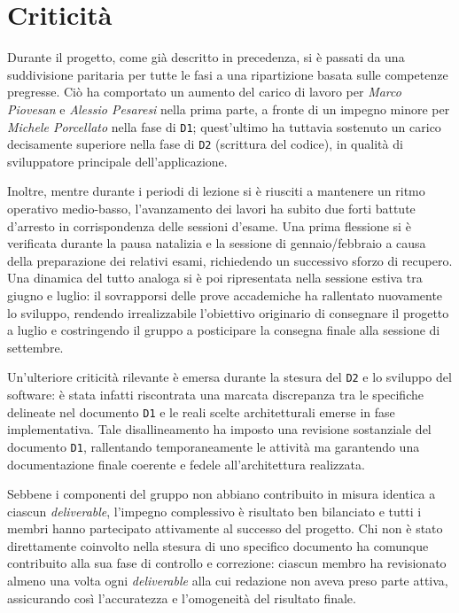 \section{Criticità}

Durante il progetto, come già descritto in precedenza, si è passati da una suddivisione paritaria per tutte le fasi a una ripartizione basata sulle competenze pregresse. Ciò ha comportato un aumento del carico di lavoro per \textit{Marco Piovesan} e \textit{Alessio Pesaresi} nella prima parte, a fronte di un impegno minore per \textit{Michele Porcellato} nella fase di \texttt{D1}; quest'ultimo ha tuttavia sostenuto un carico decisamente superiore nella fase di \texttt{D2} (scrittura del codice), in qualità di sviluppatore principale dell'applicazione.

Inoltre, mentre durante i periodi di lezione si è riusciti a mantenere un ritmo operativo medio-basso, l'avanzamento dei lavori ha subito due forti battute d'arresto in corrispondenza delle sessioni d'esame. Una prima flessione si è verificata durante la pausa natalizia e la sessione di gennaio/febbraio a causa della preparazione dei relativi esami, richiedendo un successivo sforzo di recupero. Una dinamica del tutto analoga si è poi ripresentata nella sessione estiva tra giugno e luglio: il sovrapporsi delle prove accademiche ha rallentato nuovamente lo sviluppo, rendendo irrealizzabile l'obiettivo originario di consegnare il progetto a luglio e costringendo il gruppo a posticipare la consegna finale alla sessione di settembre.

Un'ulteriore criticità rilevante è emersa durante la stesura del \texttt{D2} e lo sviluppo del software: è stata infatti riscontrata una marcata discrepanza tra le specifiche delineate nel documento \texttt{D1} e le reali scelte architetturali emerse in fase implementativa. Tale disallineamento ha imposto una revisione sostanziale del documento \texttt{D1}, rallentando temporaneamente le attività ma garantendo una documentazione finale coerente e fedele all'architettura realizzata.

Sebbene i componenti del gruppo non abbiano contribuito in misura identica a ciascun \textit{deliverable}, l'impegno complessivo è risultato ben bilanciato e tutti i membri hanno partecipato attivamente al successo del progetto. Chi non è stato direttamente coinvolto nella stesura di uno specifico documento ha comunque contribuito alla sua fase di controllo e correzione: ciascun membro ha revisionato almeno una volta ogni \textit{deliverable} alla cui redazione non aveva preso parte attiva, assicurando così l'accuratezza e l'omogeneità del risultato finale.